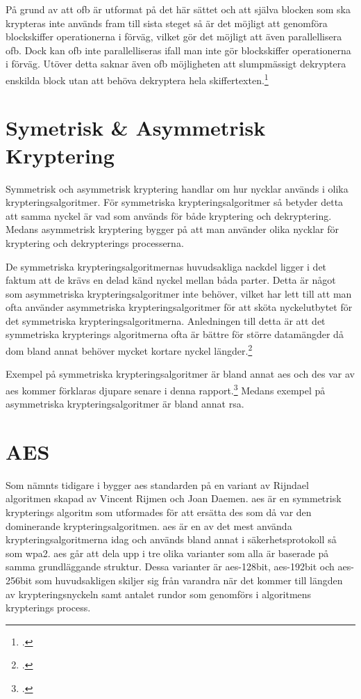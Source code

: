 På grund av att \acrshort{ofb} är utformat på det här sättet och att själva blocken som
ska krypteras inte används fram till sista steget så är det möjligt att genomföra blockskiffer
operationerna i förväg, vilket gör det möjligt att även parallellisera \acrshort{ofb}. Dock
kan \acrshort{ofb} inte parallelliseras ifall man inte gör blockskiffer operationerna
i förväg. Utöver detta saknar även \acrshort{ofb} möjligheten att slumpmässigt dekryptera
enskilda block utan att behöva dekryptera hela skiffertexten.\footcite{dworkin2001sp}

\section{Symetrisk \& Asymmetrisk Kryptering}
\label{sec:symmetric-asymmetric-encryption}
Symmetrisk och asymmetrisk kryptering handlar om hur nycklar används i olika
krypteringsalgoritmer. För symmetriska krypteringsalgoritmer så betyder detta
att samma nyckel är vad som används för både kryptering och dekryptering. Medans
asymmetrisk kryptering bygger på att man använder olika nycklar för kryptering och
dekrypterings processerna.

De symmetriska krypteringsalgoritmernas huvudsakliga nackdel ligger i det faktum att
de krävs en delad känd nyckel mellan båda parter. Detta är något som asymmetriska
krypteringsalgoritmer inte behöver, vilket har lett till att man ofta använder
asymmetriska krypteringsalgoritmer för att sköta nyckelutbytet för det symmetriska
krypteringsalgoritmerna. Anledningen till detta är att det symmetriska krypterings
algoritmerna ofta är bättre för större datamängder då dom bland annat behöver mycket
kortare nyckel längder.\footcite{symencrypt}

Exempel på symmetriska krypteringsalgoritmer är bland annat \acrshort{aes} och
\acrshort{des} var av \acrshort{aes} kommer förklaras djupare senare i denna rapport.\footcite{symencrypt}
Medans exempel på asymmetriska krypteringsalgoritmer är bland annat \gls{rsa}.

\section{AES}
\label{sec:aes}

Som nämnts tidigare i  bygger \acrshort{aes} standarden på en variant av Rijndael  algoritmen
skapad av Vincent Rijmen och Joan Daemen. \acrshort{aes} är en symmetrisk  krypterings algoritm som utformades för att ersätta
\acrshort{des} som då var den dominerande krypteringsalgoritmen. \acrshort{aes} är en av det mest använda krypteringsalgoritmerna idag
och används bland annat i säkerhetsprotokoll så som \acrfull{wpa2}. \acrshort{aes} går att dela upp i tre olika varianter
som alla är baserade på samma grundläggande struktur. Dessa varianter är \acrshort{aes}-128bit, \acrshort{aes}-192bit och \acrshort{aes}-256bit som huvudsakligen
skiljer sig från varandra när det kommer till längden av krypteringsnyckeln samt antalet rundor som genomförs i algoritmens krypterings process.

